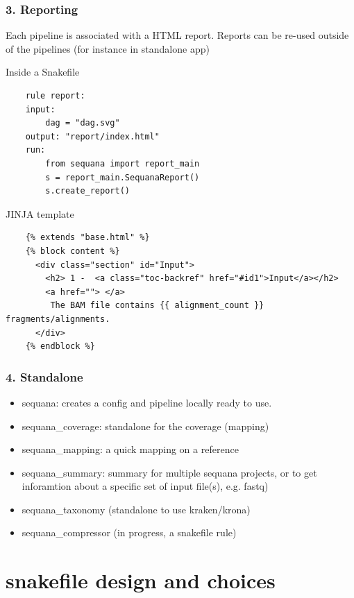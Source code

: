 \documentclass{beamer}
\begin{document}
\begin{frame}[fragile]
    \frametitle{3. Reporting}
    Each pipeline is associated with a HTML report. Reports can be re-used 
    outside of the pipelines (for instance in standalone app)
    \begin{block}{Inside a Snakefile}
    \begin{lstlisting}
    rule report:
    input:
        dag = "dag.svg"
    output: "report/index.html"
    run:
        from sequana import report_main
        s = report_main.SequanaReport()
        s.create_report()
    \end{lstlisting}
    \end{block}
    
    \begin{block}{JINJA template}
    \begin{lstlisting}
    {% extends "base.html" %}
    {% block content %}
      <div class="section" id="Input">
        <h2> 1 -  <a class="toc-backref" href="#id1">Input</a></h2>
        <a href=""> </a>
         The BAM file contains {{ alignment_count }} fragments/alignments.
      </div>
    {% endblock %}
  \end{lstlisting}
   \end{block}

 
\end{frame}



\begin{frame}[fragile]
    \frametitle{4. Standalone}
    
    \begin{itemize}
     \item sequana: creates a config and pipeline locally ready to use.
     \item sequana\_coverage: standalone for the coverage (mapping) 
     \item sequana\_mapping:  a quick mapping on a reference
     \item sequana\_summary: summary for multiple sequana projects, or to get inforamtion about a specific set of input file(s), e.g. fastq)
     \item sequana\_taxonomy (standalone to use kraken/krona)   
     \item sequana\_compressor  (in progress, a snakefile rule)
    \end{itemize}   
\end{frame}



\section{snakefile design and choices}
\end{document}
